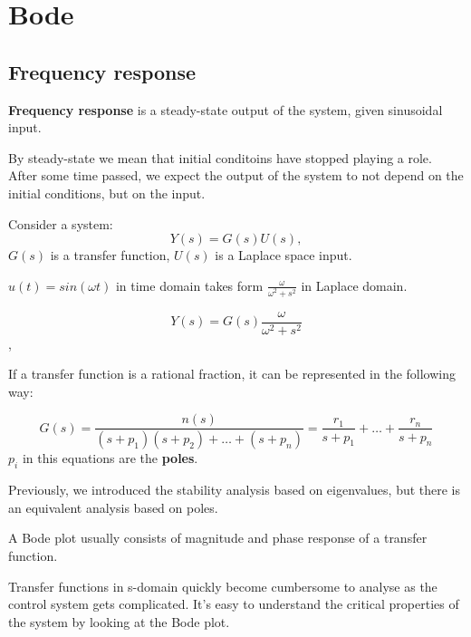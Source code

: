\section{Bode}

\subsection{Frequency response}

\begin{tcolorbox}[colback=green!10,colframe=green!50!black,title=\textbf{Frequency response}]
    \textbf{Frequency response} is a steady-state output of the system, given sinusoidal input.
\end{tcolorbox}


By steady-state we mean that initial conditoins have stopped playing a role.
After some time passed, we expect the output of the system to not depend on the initial conditions, but on the input. 

Consider a system:
\[Y(s) = G(s)U(s),\]
$G(s)$ is a transfer function, $U(s)$ is a Laplace space input. 

$u(t) = sin(\omega t)$ in time domain takes form $\frac{\omega}{\omega^2 + s^2}$ in  Laplace domain.

\[Y(s) = G(s) \frac{\omega}{\omega^2 + s^2}\], 

If a transfer function is a rational fraction, it can be represented in the following way:

\[G(s) = \dfrac{n(s)}{(s+p_1)(s+p_2) + \dots + (s+p_n)} = \dfrac{r_1}{s+p_1} + \dots + \dfrac{r_n}{s+p_n}\]
$p_i$ in this equations are the \textbf{poles}. 

Previously, we introduced the stability analysis based on eigenvalues, but there is an equivalent analysis based on poles. 


A Bode plot usually consists of magnitude and phase response of a transfer function.

Transfer functions in s-domain quickly become cumbersome to analyse as the control system gets complicated. It’s easy to understand the critical properties of the system by looking at the Bode plot.






